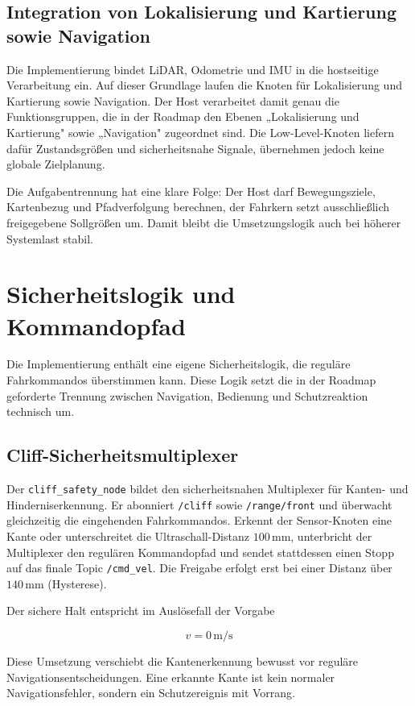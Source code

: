 \subsection{Integration von Lokalisierung und Kartierung sowie Navigation}

Die Implementierung bindet LiDAR, Odometrie und IMU in die hostseitige Verarbeitung ein. Auf dieser Grundlage laufen die Knoten für Lokalisierung und Kartierung sowie Navigation. Der Host verarbeitet damit genau die Funktionsgruppen, die in der Roadmap den Ebenen „Lokalisierung und Kartierung" sowie „Navigation" zugeordnet sind. Die Low-Level-Knoten liefern dafür Zustandsgrößen und sicherheitsnahe Signale, übernehmen jedoch keine globale Zielplanung.

Die Aufgabentrennung hat eine klare Folge: Der Host darf Bewegungsziele, Kartenbezug und Pfadverfolgung berechnen, der Fahrkern setzt ausschließlich freigegebene Sollgrößen um. Damit bleibt die Umsetzungslogik auch bei höherer Systemlast stabil.

\section{Sicherheitslogik und Kommandopfad}

Die Implementierung enthält eine eigene Sicherheitslogik, die reguläre Fahrkommandos überstimmen kann. Diese Logik setzt die in der Roadmap geforderte Trennung zwischen Navigation, Bedienung und Schutzreaktion technisch um.

\subsection{Cliff-Sicherheitsmultiplexer}

Der \texttt{cliff\_safety\_node} bildet den sicherheitsnahen Multiplexer für Kanten- und Hinderniserkennung. Er abonniert \texttt{/cliff} sowie \texttt{/range/front} und überwacht gleichzeitig die eingehenden Fahrkommandos. Erkennt der Sensor-Knoten eine Kante oder unterschreitet die Ultraschall-Distanz $100\,\mathrm{mm}$, unterbricht der Multiplexer den regulären Kommandopfad und sendet stattdessen einen Stopp auf das finale Topic \texttt{/cmd\_vel}. Die Freigabe erfolgt erst bei einer Distanz über $140\,\mathrm{mm}$ (Hysterese).

Der sichere Halt entspricht im Auslösefall der Vorgabe

$$v = 0\,\mathrm{m/s}$$

Diese Umsetzung verschiebt die Kantenerkennung bewusst vor reguläre Navigationsentscheidungen. Eine erkannte Kante ist kein normaler Navigationsfehler, sondern ein Schutzereignis mit Vorrang.

